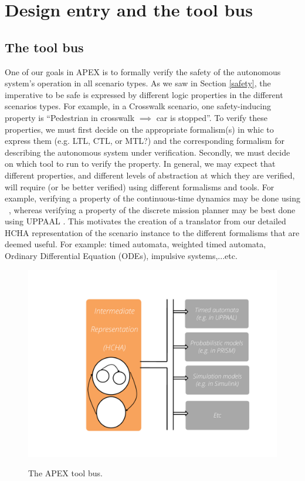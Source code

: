 \section{Design entry and the tool bus}
\label{designEntryAndToolBus}

\subsection{The tool bus}
\label{tool bus}
One of our goals in APEX is to formally verify the safety of the autonomous system's operation in all scenario types.
As we saw in Section \ref{safety}, the imperative to be safe is expressed by different logic properties in the different scenarios types.
For example, in a Crosswalk scenario, one safety-inducing property is ``Pedestrian in crosswalk $\implies$ car is stopped''.
To verify these properties, we must first decide on the appropriate formalism(s) in whic to express them (e.g. LTL, CTL, or MTL?) 
and the corresponding formalism for describing the autonomous system under verification.
Secondly, we must decide on which tool to run to verify the property.
In general, we may expect that different properties, and different levels of abstraction at which they are verified, will require (or be better verified) using different formalisms and tools. 
For example, verifying a property of the continuous-time dynamics may be done using {\staliro}~\cite{AnnapureddyLFS11tacas},
whereas verifying a property of the discrete mission planner may be best done using UPPAAL \cite{BehrmannDLHPYH06qest}.
This motivates the creation of a translator from our detailed HCHA representation of the scenario instance to the different formalisms that are deemed useful. 
For example: timed automata, weighted timed automata, Ordinary Differential Equation (ODEs), impulsive systems,...etc.

\begin{figure}[tb]
	\centering
		\includegraphics[scale=0.3]{figures/toolbus.pdf}
	\label{fig:toolbus}
	\caption{The APEX tool bus.}
\end{figure}

